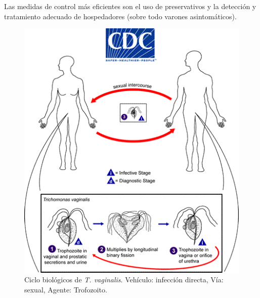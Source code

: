 Las medidas de control más eficientes son el uso de preservativos y la detección y tratamiento adecuado de hospedadores (sobre todo varones asintomáticos).
\begin{multicols}{2}
	\begin{figure}[H]
		\centering
		\includegraphics[width=\columnwidth]{A.imagenes/ACV-BioSan-Parasit-TVaginalisCBios}
		\caption[Ciclo biológico de \textit{T. vaginalis}]{Ciclo biológicos de \textit{T. vaginalis}. Vehículo: infección directa, Vía: sexual, Agente: Trofozoito.\label{fig:PARASIT:TvaginalisCBios}}
	\end{figure}
	\columnbreak
	\begin{figure}[H]
		\centering

\end{figure}
\end{multicols}

